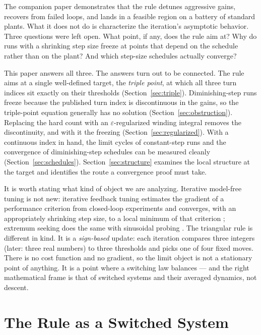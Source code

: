 \documentclass[twocolumn]{ifacconf}
\begin{document}
The companion paper demonstrates that the rule detunes aggressive gains,
recovers from failed loops, and lands in a feasible region on a battery of
standard plants. What it does not do is characterize the iteration's
asymptotic behavior. Three questions were left open. What point, if any, does
the rule aim at? Why do runs with a shrinking step size freeze at points that
depend on the schedule rather than on the plant? And which step-size schedules
actually converge?

This paper answers all three. The answers turn out to be connected. The rule
aims at a single well-defined target, the \emph{triple point}, at which all
three turn indices sit exactly on their thresholds (Section~\ref{sec:triple}).
Diminishing-step runs freeze because the published turn index is discontinuous
in the gains, so the triple-point equation generally has no solution
(Section~\ref{sec:obstruction}). Replacing the hard count with an
$\varepsilon$-regularized winding integral removes the discontinuity, and with
it the freezing (Section~\ref{sec:regularized}). With a continuous index in
hand, the limit cycles of constant-step runs and the convergence of
diminishing-step schedules can be measured cleanly (Section~\ref{sec:schedules}).
Section~\ref{sec:structure} examines the local structure at the target and
identifies the route a convergence proof must take.

It is worth stating what kind of object we are analyzing. Iterative model-free
tuning is not new: iterative feedback tuning estimates the gradient of a
performance criterion from closed-loop experiments and converges, with an
appropriately shrinking step size, to a local minimum of that criterion
\cite{Hjalmarsson1998}; extremum seeking does the same with sinusoidal probing
\cite{Killingsworth2006}. The triangular rule is different in kind. It is a
\emph{sign-based} update: each iteration compares three integers (later: three
real numbers) to three thresholds and picks one of four fixed moves. There is
no cost function and no gradient, so the limit object is not a stationary point
of anything. It is a point where a switching law balances --- and the right
mathematical frame is that of switched systems and their averaged dynamics, not
descent.

\section{The Rule as a Switched System}
\label{sec:rule}
\end{document}

